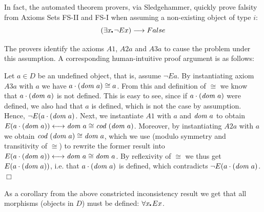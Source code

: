 In fact, the automated theorem provers, via Sledgehammer, quickly
prove falsity from Axioms Sets FS-II and FS-I when assuming a 
 non-existing object of type $i$:
$$(\exists x\lambdot \neg E x) \imp False$$

The provers identify the axioms $A1$,
 $A2a$ and $A3a$ to cause the problem under this assumption. A
 corresponding  human-intuitive proof argument is as follows:
 
 Let $a\in D$ be an undefined object, that is, assume $¬E a$.  By
 instantiating axiom $A3a$ with $a$ we have $a \cdot (\textit{dom \/} a) \cong a$.  From
 this and definition of $\cong$ we know that $a \cdot (\textit{dom \/} a)$ is not
 defined. This is easy to see, since if $a \cdot (\textit{dom \/} a)$ were defined, we
 also had that $a$ is defined, which is not the case by assumption.
  Hence, $\neg E (a \cdot (\textit{dom \/} a)$.
Next, we instantiate $A1$ with $a$ and $\textit{dom \/} a$ to obtain
   $E(a \cdot (\textit{dom \/} a)) \longleftrightarrow \textit{dom \/} a \cong \textit{cod \/}(\textit{dom \/} a)$. Moreover,
   by instantiating $A2a$ with $a$ we obtain $\textit{cod \/}(\textit{dom \/} a) \cong \textit{dom \/} a$,
   which we use (modulo symmetry and transitivity of $\cong$) to
   rewrite the former result into 
   $E(a \cdot (\textit{dom \/} a)) \longleftrightarrow \textit{dom \/} a \cong \textit{dom \/} a$. By reflexivity of
   $\cong$ we thus get $E(a \cdot (\textit{dom \/} a))$, i.e. that $a \cdot
   (\textit{dom \/} a)$ is defined, which contradicts $\neg E (a \cdot (\textit{dom \/}
   a)$. $\Box$

As a corollary from the above constricted inconsistency result we get
that all morphisms (objects in $D$) must be
defined: $\forall x\lambdot E x$.









